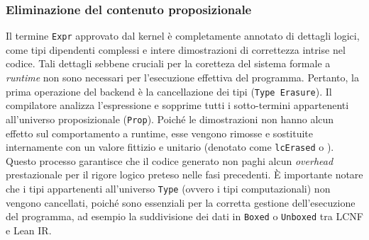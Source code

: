 \subsubsection{Eliminazione del contenuto proposizionale}
Il termine \texttt{Expr} approvato dal kernel è completamente annotato di dettagli logici, come tipi dipendenti complessi e intere dimostrazioni di correttezza intrise nel codice. Tali dettagli sebbene cruciali 
per la coretteza del sistema formale a \textit{runtime} non sono necessari per l'esecuzione effettiva del programma. Pertanto, la prima operazione del backend è la cancellazione dei tipi (\texttt{Type Erasure}). 
Il compilatore analizza l'espressione e sopprime tutti i sotto-termini appartenenti all'universo proposizionale (\texttt{Prop}). Poiché le dimostrazioni non hanno alcun effetto sul comportamento a runtime, esse 
vengono rimosse e sostituite internamente con un valore fittizio e unitario (denotato come \texttt{lcErased} o \scalebox{0.8}{$\blacksquare$}). Questo processo garantisce che il codice generato non paghi alcun 
\textit{overhead} prestazionale per il rigore logico preteso nelle fasi precedenti. È importante notare che i tipi appartenenti all'universo \texttt{Type} (ovvero i tipi computazionali) non vengono cancellati, 
poiché sono essenziali per la corretta gestione dell'esecuzione del programma, ad esempio la suddivisione dei dati in \texttt{Boxed} o \texttt{Unboxed} tra LCNF e Lean IR.

